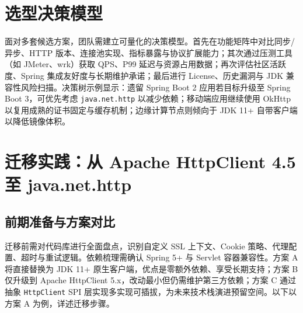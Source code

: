 \chapter{选型决策模型}
面对多套候选方案，团队需建立可量化的决策模型。首先在功能矩阵中对比同步/异步、HTTP 版本、连接池实现、指标暴露与协议扩展能力；其次通过压测工具（如 JMeter、wrk）获取 QPS、P99 延迟与资源占用数据；再次评估社区活跃度、Spring 集成友好度与长期维护承诺；最后进行 License、历史漏洞与 JDK 兼容性风险扫描。决策树示例显示：遗留 Spring Boot 2 应用若目标升级至 Spring Boot 3，可优先考虑 \texttt{java.net.http} 以减少依赖；移动端应用继续使用 OkHttp 以复用成熟的证书固定与缓存机制；边缘计算节点则倾向于 JDK 11+ 自带客户端以降低镜像体积。\par
\chapter{迁移实践：从 Apache HttpClient 4.5 至 java.net.http}
\section{前期准备与方案对比}
迁移前需对代码库进行全面盘点，识别自定义 SSL 上下文、Cookie 策略、代理配置、超时与重试逻辑。依赖梳理需确认 Spring 5+ 与 Servlet 容器兼容性。方案 A 将直接替换为 JDK 11+ 原生客户端，优点是零额外依赖、享受长期支持；方案 B 仅升级到 Apache HttpClient 5.x，改动最小但仍需维护第三方依赖；方案 C 通过抽象 \texttt{HttpClient} SPI 层实现多实现可插拔，为未来技术栈演进预留空间。以下以方案 A 为例，详述迁移步骤。\par
